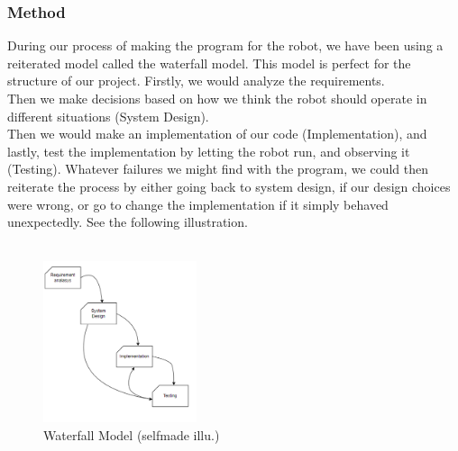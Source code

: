 \documentclass[conference]{IEEEtran}
\begin{document}
\subsubsection{Method}
During our process of making the program for the robot, we have been using a reiterated model called the waterfall model.
This model is perfect for the structure of our project. Firstly, we would analyze the requirements. \\
Then we make decisions based on how we think the robot should operate in different situations (System Design).\\
Then we would make an implementation of our code (Implementation), and lastly, test the implementation by 
letting the robot run, and observing it (Testing). Whatever failures we might find with the program, 
we could then reiterate the process by either going back to system design, if our design choices were wrong, 
or go to change the implementation if it simply behaved unexpectedly. See the following illustration.\\
\vspace{4cm}\\
\begin{figure}[h] %
    \centering
    \includegraphics[width=0.4\textwidth]{waterfallmodel.png}
    \caption{Waterfall Model (selfmade illu.)}
\end{figure} 
\\
\end{document}
